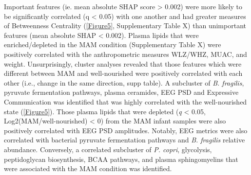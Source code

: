 \documentclass{article}
\begin{document}
Important features (ie. mean absolute \gls{SHAP} score \textgreater{} 0.002) were more likely to be significantly correlated (q \textless{} 0.05) with one another and had greater measures of Betweenness Centrality (\autoref{Figure5}, Supplementary Table X) than unimportant features (mean absolute \gls{SHAP} \textless{} 0.002).
Plasma lipids that were enriched/depleted in the \gls{MAM} condition (Supplementary Table X) were positively correlated with the anthropometric measures \gls{WLZ/WHZ}, \gls{MUAC}, and weight.
Unsurprisingly, cluster analyses revealed that those features which were different between \gls{MAM} and well-nourished were positively correlated with each other (i.e., change in the same direction, supp table).
A subcluster of \textit{B. fragilis}, pyruvate fermentation pathways, plasma ceramides, EEG PSD and Expressive Communication was identified that was highly correlated with the well-nourished state (\autoref{Figure5}).
Those plasma lipids that were depleted (\textit{q} \textless{} 0.05, Log2(\gls{MAM}/well-nourished) \textless{} 0) from the \gls{MAM} infant samples were also positively correlated with EEG PSD amplitudes.
Notably, EEG metrics were also correlated with bacterial pyruvate fermentation pathways and \textit{B. fragilis} relative abundance.
Conversely, a correlated subcluster of \textit{P. copri}, glycolysis, peptidoglycan biosynthesis, BCAA pathways, and plasma sphingomyelins that were associated with the \gls{MAM} condition was identified. 
\end{document}
